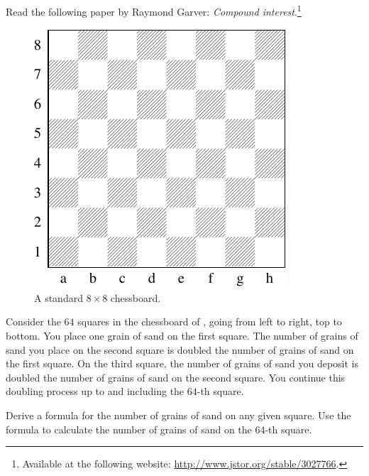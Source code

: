 \documentclass[a4paper,oneside,12pt]{article}
\begin{document}
\begin{problem}
\item Read the following paper by Raymond Garver:
  \emph{Compound interest}.\footnote{
    Available at the following website:
    \url{http://www.jstor.org/stable/3027766}.
  }

\begin{figure}[!htbp]
\centering
\includegraphics[scale=1.1]{image/11/chessboard.pdf}
\caption{%
  A standard $8 \times 8$ chessboard.
}
\label{fig:chessboard}
\end{figure}

\item Consider the $64$ squares in the chessboard of
  , going from left to right, top to bottom.
  You place one grain of sand on the first square.  The number of
  grains of sand you place on the second square is doubled the number
  of grains of sand on the first square.  On the third square, the
  number of grains of sand you deposit is doubled the number of grains
  of sand on the second square.  You continue this doubling process up
  to and including the $64$-th square.
  \begin{packedenum}
  \item\label{subprob:sand_formula}
    Derive a formula for the number of grains of sand on any given
    square.  Use the formula to calculate the number of grains of sand
    on the $64$-th square.


\end{packedenum}
\end{problem}
\end{document}

